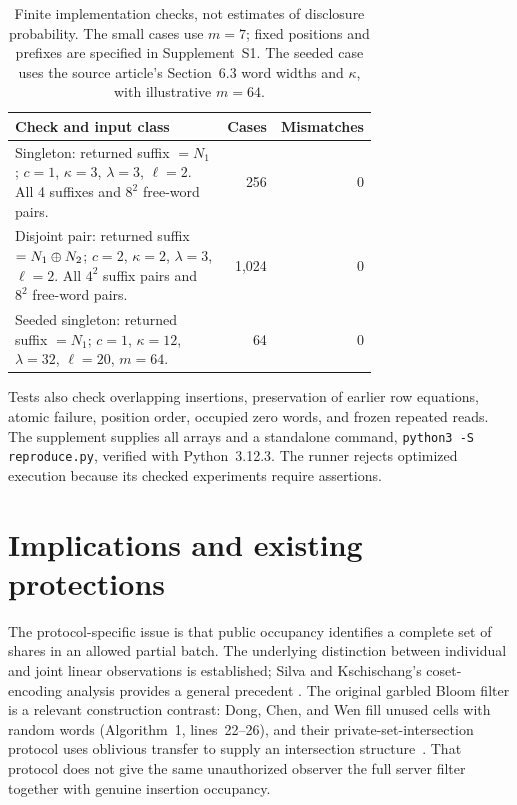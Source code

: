 \begin{table}[ht]
\centering
\small
\begin{tabular}{@{}>{\raggedright\arraybackslash}p{0.72\linewidth}rr@{}}
\toprule
Check and input class & Cases & Mismatches\\
\midrule
Singleton: returned suffix $=N_1$; $c=1$, $\kappa=3$,
$\lambda=3$, $\ell=2$. All 4 suffixes and $8^2$ free-word pairs.
& 256 & 0\\[3pt]
Disjoint pair: returned suffix $=N_1\mathbin{\oplus} N_2$; $c=2$, $\kappa=2$,
$\lambda=3$, $\ell=2$. All $4^2$ suffix pairs and $8^2$ free-word pairs.
& 1,024 & 0\\[3pt]
Seeded singleton: returned suffix $=N_1$; $c=1$, $\kappa=12$,
$\lambda=32$, $\ell=20$, $m=64$.
& 64 & 0\\
\bottomrule
\end{tabular}
\caption{Finite implementation checks, not estimates of disclosure probability.
The small cases use $m=7$; fixed positions and prefixes are specified in
Supplement~S1. The seeded case uses the source article's Section~6.3 word widths
and $\kappa$, with illustrative $m=64$.}
\label{tab:checks}
\end{table}

Tests also check overlapping insertions, preservation of earlier row equations,
atomic failure, position order, occupied zero words, and frozen repeated reads.
The supplement supplies all arrays and a standalone command,
\texttt{python3 -S reproduce.py}, verified with Python~3.12.3. The runner
rejects optimized execution because its checked experiments require assertions.

\section{Implications and existing protections}

The protocol-specific issue is that public occupancy identifies a complete
set of shares in an allowed partial batch. The underlying distinction between
individual and joint linear observations is established; Silva and
Kschischang's coset-encoding analysis provides a general precedent
\cite{silva2011universal}. The original garbled Bloom filter is a relevant
construction contrast: Dong, Chen, and Wen fill unused cells with random words
(Algorithm~1, lines~22--26), and their private-set-intersection protocol uses
oblivious transfer to supply an intersection structure~\cite{dong2013gbf}.
That protocol does not give the same unauthorized observer the full server
filter together with genuine insertion occupancy.

